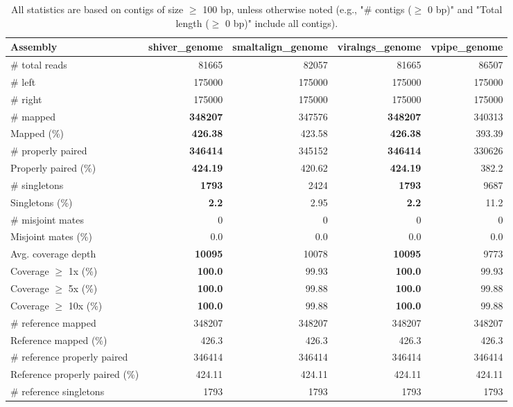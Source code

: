 \documentclass[12pt,a4paper]{article}
\begin{document}
\begin{table}[ht]
\begin{center}
\caption{All statistics are based on contigs of size $\geq$ 100 bp, unless otherwise noted (e.g., "\# contigs ($\geq$ 0 bp)" and "Total length ($\geq$ 0 bp)" include all contigs).}
\begin{tabular}{|l*{4}{|r}|}
\hline
Assembly & shiver\_genome & smaltalign\_genome & viralngs\_genome & vpipe\_genome \\ \hline
\# total reads & 81665 & 82057 & 81665 & 86507 \\ \hline
\# left & 175000 & 175000 & 175000 & 175000 \\ \hline
\# right & 175000 & 175000 & 175000 & 175000 \\ \hline
\# mapped & {\bf 348207} & 347576 & {\bf 348207} & 340313 \\ \hline
Mapped (\%) & {\bf 426.38} & 423.58 & {\bf 426.38} & 393.39 \\ \hline
\# properly paired & {\bf 346414} & 345152 & {\bf 346414} & 330626 \\ \hline
Properly paired (\%) & {\bf 424.19} & 420.62 & {\bf 424.19} & 382.2 \\ \hline
\# singletons & {\bf 1793} & 2424 & {\bf 1793} & 9687 \\ \hline
Singletons (\%) & {\bf 2.2} & 2.95 & {\bf 2.2} & 11.2 \\ \hline
\# misjoint mates & 0 & 0 & 0 & 0 \\ \hline
Misjoint mates (\%) & 0.0 & 0.0 & 0.0 & 0.0 \\ \hline
Avg. coverage depth & {\bf 10095} & 10078 & {\bf 10095} & 9773 \\ \hline
Coverage $\geq$ 1x (\%) & {\bf 100.0} & 99.93 & {\bf 100.0} & 99.93 \\ \hline
Coverage $\geq$ 5x (\%) & {\bf 100.0} & 99.88 & {\bf 100.0} & 99.88 \\ \hline
Coverage $\geq$ 10x (\%) & {\bf 100.0} & 99.88 & {\bf 100.0} & 99.88 \\ \hline
\# reference mapped & 348207 & 348207 & 348207 & 348207 \\ \hline
Reference mapped (\%) & 426.3 & 426.3 & 426.3 & 426.3 \\ \hline
\# reference properly paired & 346414 & 346414 & 346414 & 346414 \\ \hline
Reference properly paired (\%) & 424.11 & 424.11 & 424.11 & 424.11 \\ \hline
\# reference singletons & 1793 & 1793 & 1793 & 1793 \\ \hline

\end{tabular}
\end{center}
\end{table}
\end{document}

